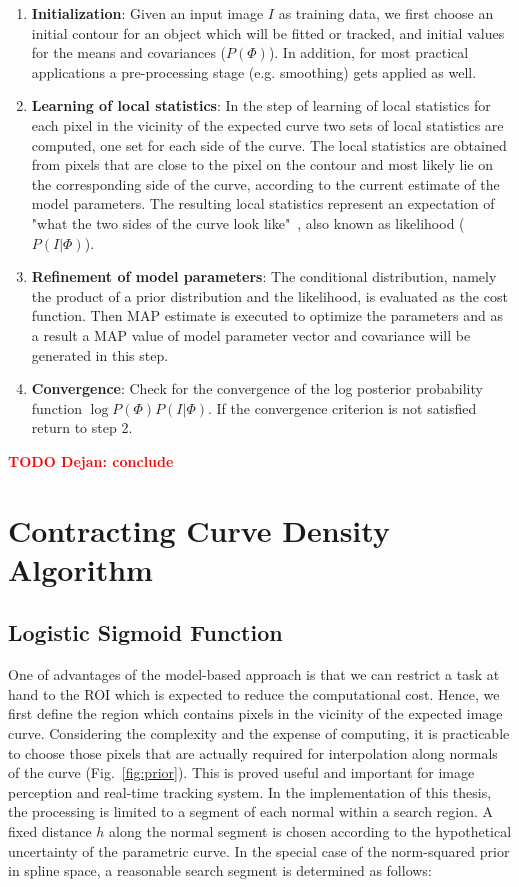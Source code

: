 \documentclass[conference]{IEEEtran}
\newcommand{\todod}[1]{\textbf{\textcolor{red}{TODO Dejan: #1}}}
\begin{document}
\begin{enumerate}
\item \textbf{Initialization}: Given an input image $I$ as training data, we first choose an initial
  contour for an object which will be fitted or tracked, and
  initial values for the means and covariances ($P(\Phi)$). In addition, for most practical
  applications a pre-processing stage (e.g. smoothing) gets applied as well.
\item \textbf{Learning of local statistics}: 
  In the step of learning of local statistics for each pixel in the
  vicinity of the expected curve two sets of local statistics
  are computed, one set for each side of the curve. The local statistics are obtained from
  pixels that are close to the pixel on the contour and most likely lie
  on the corresponding side of the curve, according to the current
  estimate of the model parameters. The resulting local statistics
  represent an expectation of "what the two sides of the curve look
  like"~\cite{hanek2004contracting}, also known as likelihood ($P(I|\Phi)$).
\item \textbf{Refinement of model parameters}: The conditional distribution, namely
  the product of a prior distribution and the likelihood, is evaluated
  as the cost function. Then MAP estimate is executed to optimize the
  parameters and as a result a MAP value of model parameter vector and
  covariance will be generated in this step.
\item \textbf{Convergence}: Check for the convergence of the 
  log posterior probability function $\log{P(\Phi) P(I|\Phi)}$. 
  If the convergence criterion is not satisfied return to step 2.
\end{enumerate}
\todod{conclude}
\section{Contracting Curve Density Algorithm}
\label{sec:ccd_novelties}
\subsection{Logistic Sigmoid Function}
One of advantages of the
model-based approach is that we can restrict a task at hand to the ROI
which is
expected to reduce the computational cost. Hence, we first define
the region which contains pixels in the vicinity of the expected image
curve. Considering the complexity and the expense of computing, it is practicable
to choose those pixels that are actually required for interpolation along
normals of the curve (Fig.~\ref{fig:prior}). This is proved useful and important for image
perception and real-time tracking system. In the implementation of
this thesis, the processing is limited to a segment of each normal within
a search region. A fixed distance $h$ along the normal segment is
chosen according to the hypothetical uncertainty of the parametric curve. In the
special case of the norm-squared prior in spline space, a reasonable
search segment is determined as follows:
\end{document}
